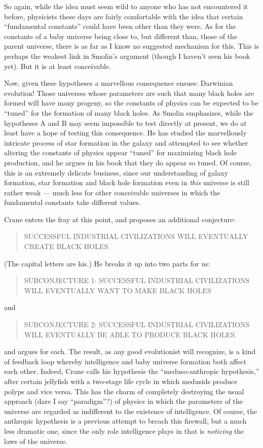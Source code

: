 \documentclass{article}
\begin{document}
So again, while the idea must seem wild to anyone who has not
encountered it before, physicists these days are fairly comfortable with
the idea that certain ``fundamental constants'' could have been other
than they were. As for the constants of a baby universe being close to,
but different than, those of the parent universe, there is as far as I
know no suggested mechanism for this. This is perhaps the weakest link
in Smolin's argument (though I haven't seen his book yet). But it is at
least conceivable.

Now, given these hypotheses a marvellous consequence ensues: Darwinian
evolution! Those universes whose parameters are such that many black
holes are formed will have many progeny, so the constants of physics can
be expected to be ``tuned'' for the formation of many black holes. As
Smolin emphasizes, while the hypotheses A and B may seem impossible to
test directly at present, we do at least have a hope of testing this
consequence. He has studied the marvellously intricate process of star
formation in the galaxy and attempted to see whether altering the
constants of physics appear ``tuned'' for maximizing black hole
production, and he argues in his book that they do appear so tuned. Of
course, this is an extremely delicate business, since our understanding
of galaxy formation, star formation and black hole formation even in
\emph{this} universe is still rather weak --- much less for other
conceivable universes in which the fundamental constants take different
values.

Crane enters the fray at this point, and proposes an additional
conjecture:

\begin{quote}
SUCCESSFUL INDUSTRIAL CIVILIZATIONS WILL EVENTUALLY CREATE BLACK HOLES.
\end{quote}
\noindent
(The capital letters are his.) He breaks it up into two parts for us:

\begin{quote}
SUBCONJECTURE 1: SUCCESSFUL INDUSTRIAL CIVILIZATIONS WILL EVENTUALLY
WANT TO MAKE BLACK HOLES
\end{quote}
\noindent
and

\begin{quote}
SUBCONJECTURE 2: SUCCESSFUL INDUSTRIAL CIVILIZATIONS WILL EVENTUALLY BE
ABLE TO PRODUCE BLACK HOLES.
\end{quote}
\noindent
and argues for each. The result, as any good evolutionist will
recognize, is a kind of feedback loop whereby intelligence and baby
universe formation both affect each other. Indeed, Crane calls his
hypothesis the ``meduso-anthropic hypothesis,'' after certain jellyfish
with a two-stage life cycle in which medusids produce polyps and vice
versa. This has the charm of completely destroying the usual approach
(dare I say ``paradigm''?) of physics in which the parameters of the
universe are regarded as indifferent to the existence of intelligence.
Of course, the anthropic hypothesis is a previous attempt to breach this
firewall, but a much less dramatic one, since the only role intelligence
plays in that is \emph{noticing} the laws of the universe.
\end{document}
